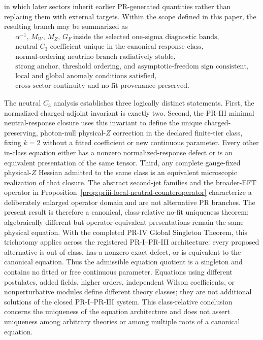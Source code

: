 \documentclass[11pt]{article}
\begin{document}
in which later sectors inherit earlier PR-generated quantities rather than replacing them with external targets. Within the scope defined in this paper, the resulting branch may be summarized as
\begin{equation}
\boxed{
\begin{gathered}
\alpha^{-1},\,M_W,\,M_Z,\,G_F
\ \text{inside the selected one-sigma diagnostic bands},\\
\text{neutral \(C_3\) coefficient unique in the canonical response class},\\
\text{normal-ordering neutrino branch radiatively stable},\\
\text{strong anchor, threshold ordering, and asymptotic-freedom sign consistent},\\
\text{local and global anomaly conditions satisfied},\\
\text{cross-sector continuity and no-fit provenance preserved}.
\end{gathered}
}
\end{equation}

The neutral \(C_3\) analysis establishes three logically distinct statements.
First, the normalized charged-adjoint invariant is exactly two.  Second, the
PR-III minimal neutral-response closure uses this invariant to define the
unique charged-preserving, photon-null physical-\(Z\) correction in the
declared finite-tier class, fixing \(k=2\) without a fitted coefficient or new
continuous parameter.  Every other in-class equation either has a nonzero
normalized-response defect or is an equivalent presentation of the same
tensor.  Third, any complete gauge-fixed physical-$Z$ Hessian admitted to the
same class is an equivalent microscopic realization of that closure.  The abstract second-jet
families and the broader-EFT operator in
Proposition~\ref{prop:priii-local-neutral-counteroperator} characterize a
deliberately enlarged operator domain and are not alternative PR branches.  The
present result is therefore a canonical, class-relative no-fit uniqueness
theorem; algebraically different but operator-equivalent presentations remain
the same physical equation.  With the completed PR-IV Global Singleton Theorem, this
trichotomy applies across the registered PR-I--PR-III architecture: every
proposed alternative is out of class, has a nonzero exact defect, or is
equivalent to the canonical equation.  Thus the admissible equation quotient
is a singleton and contains no fitted or free continuous parameter.  Equations
using different postulates, added fields, higher orders, independent Wilson
coefficients, or nonperturbative modules define different theory classes; they
are not additional solutions of the closed PR-I--PR-III system.  This
class-relative conclusion concerns the uniqueness of the equation
architecture and does not assert uniqueness among arbitrary theories or among
multiple roots of a canonical equation.


\newpage
 
 
\end{document}
